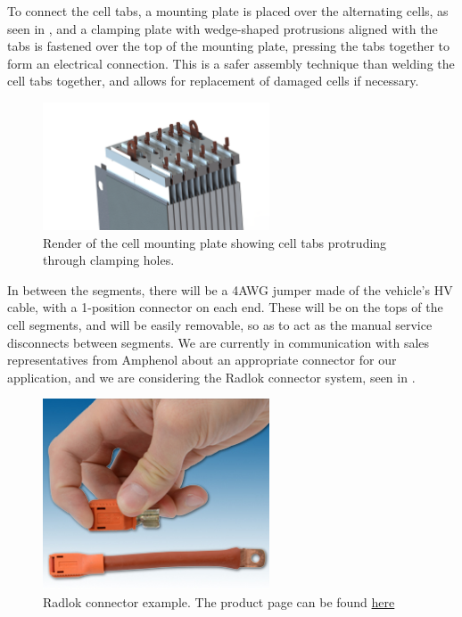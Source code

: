 \documentclass{article}
\begin{document}
To connect the cell tabs, a mounting plate is placed over the alternating cells, as seen in , and a clamping plate with wedge-shaped protrusions aligned with the tabs is fastened over the top of the mounting plate, pressing the tabs together to form an electrical connection. This is a safer assembly technique than welding the cell tabs together, and allows for replacement of damaged cells if necessary. 

\begin{figure}[H]
\centering
\includegraphics[width=0.6\textwidth]{accumulator_tabs.png}
\caption{Render of the cell mounting plate showing cell tabs protruding through clamping holes.}
\label{fig:cell_tabs}
\end{figure}

In between the segments, there will be a 4AWG jumper made of the vehicle's HV cable, with a 1-position connector on each end. These will be on the tops of the cell segments, and will be easily removable, so as to act as the manual service disconnects between segments. We are currently in communication with sales representatives from Amphenol about an appropriate connector for our application, and we are considering the Radlok connector system, seen in .


\begin{figure}[H]
\centering
\includegraphics[width=0.6\textwidth]{RADLOK-main.jpg}
\caption{Radlok connector example. The product page can be found \href{http://www.amphenol-industrial.com/radlok}{here}}
\label{fig:radlok}
\end{figure}
\end{document}
